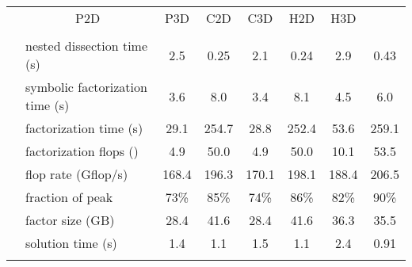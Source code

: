 \documentclass{article}
\begin{document}
\begin{table}[htp!]\footnotesize
  \renewcommand{\arraystretch}{1.25}
  \setlength{\tabcolsep}{0.35em}
  \newcommand{\ce}[1]{\multicolumn{1}{c|}{#1}}
  \newcommand{\cee}[1]{\multicolumn{1}{c|}{#1}}
  \begin{center}
    \begin{tabular}{|c|l||c|c|c|c|c|c|}
      \hhline{|-|-|-|-|-|-|-|-|}
      \multicolumn{2}{|r||}{problem}                                                                          
      &    \cee{P2D} &    \cee{P3D} &    \cee{C2D} &   \cee{C3D}  &    \cee{H2D} &   \cee{H3D} \\ 
      \hhline{|-|-|-|-|-|-|-|-|}
      \multicolumn{2}{|r||}{grid size}
      &         &       &     &      &   &      \\ 
      \hhline{==::=:=:=:=:=:=}
      \multirow{10}{*}{\rotatebox{90}{Multifrontal}}                                                 
      &              nested dissection time (s) &  2.5    &  0.25  & 2.1   &  0.24   & 2.9  & 0.43  \\ 
      \hhline{|~-||-|-|-|-|-|-|}                                                         
      &         symbolic factorization time (s) &  3.6    &  8.0   &  3.4  &  8.1   & 4.5  &  6.0   \\ 
      \hhline{|~-||-|-|-|-|-|-|}                                                         
      &                  factorization time (s) &  29.1  &  254.7  &  28.8 &  252.4 & 53.6 &  259.1 \\ 
      \hhline{|~-||-|-|-|-|-|-|}                                                         
      &    factorization flops () &   4.9  &  50.0  &  4.9  &   50.0  & 10.1  &  53.5  \\ 
      &   \qquad flop rate (Gflop/s) & 168.4 & 196.3   & 170.1 & 198.1  & 188.4  & 206.5 \\
      &   \qquad fraction of peak                & 73\%  & 85\%    & 74\%  & 86\%   & 82\%   & 90\% \\
      \hhline{|~-||-|-|-|-|-|-|}                                                         
      &                        factor size (GB) &  28.4   &  41.6  &  28.4  & 41.6  & 36.3   &  35.5 \\ 
      \hhline{|~-||-|-|-|-|-|-|}                                                         
      &                       solution time (s) &   1.4    & 1.1   &  1.5  &  1.1   & 2.4   &  0.91  \\ 
      \hhline{|~-||-|-|-|-|-|-|}                                                         

\end{tabular}
\end{center}
\end{table}
\end{document}
